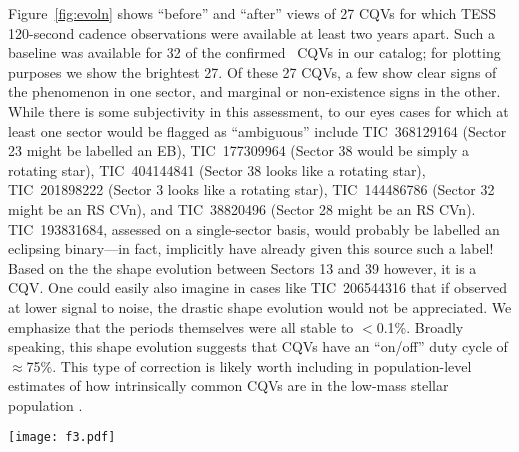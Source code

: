\documentclass[11pt,twocolumn,tighten]{aastex63}
\begin{document}
Figure~\ref{fig:evoln} shows ``before'' and ``after'' views of 27 CQVs
for which TESS 120-second cadence observations were available at least
two years apart.  Such a baseline was available for 32 of the
confirmed \ngoods\ CQVs in our catalog; for plotting purposes we show
the brightest 27.
Of these 27 CQVs, a few show clear signs of the phenomenon in one
sector, and marginal or non-existence signs in the other.
While there is some subjectivity in this assessment, to our eyes cases
for which at least one sector would be flagged as ``ambiguous''
include
TIC~368129164 (Sector 23 might be labelled an EB),
TIC~177309964 (Sector 38 would be simply a rotating star),
TIC~404144841 (Sector 38 looks like a rotating star),
TIC~201898222 (Sector 3 looks like a rotating star),
TIC~144486786 (Sector 32 might be an RS CVn),
and
TIC~38820496 (Sector 28 might be an RS CVn).
TIC~193831684, assessed on a single-sector basis, would probably be
labelled an eclipsing binary---in fact, \citet{2021ApJ...912..123J}
implicitly have already given this source such a label!  Based on the
the shape evolution between Sectors 13 and 39 however, it is a CQV.
One could easily also imagine in cases like TIC~206544316 that if
observed at lower signal to noise, the drastic shape evolution would
not be appreciated.  We emphasize that the periods themselves were all
stable to $<$0.1\%.  Broadly speaking, this shape evolution suggests
that CQVs have an ``on/off'' duty cycle of $\approx$75\%.  This type
of correction is likely worth including in population-level estimates
of how intrinsically common CQVs are in the low-mass stellar
population \citep[e.g.][]{2022AJ....163..144G}.


\begin{figure*}[!tp]
	\begin{center}
		\centering
		\texttt{[image: f3.pdf]}
		\vspace{-0.6cm}
		\caption{
		{\bf CQVs keep their periods but change their shapes.}
      32 of our \ngoods\ CQVs from Figure~\ref{fig:cqvs} had
      120-second cadence TESS data available for a baseline of at
      least two years; the 27 brightest are shown here.  Each panel
      shows one sector of TESS data, and is phased to its deepest
      minimum in flux.  Each panel's title shows the TIC identifier
      and approximate period in hours.  Text insets show the TESS
      sector numbers, which generally span two years, or at least
      1{,}000 cycles.  The vertical scale is fixed across sectors to
      clarify shape changes.
		}
		\label{fig:evoln}
	\end{center}
\end{figure*}
\end{document}
